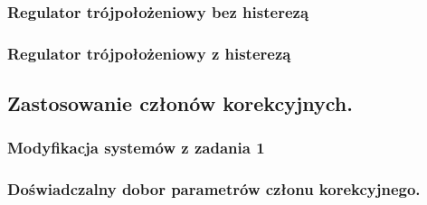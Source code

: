 \documentclass[a4paper,10pt]{article}
\begin{document}
\subsubsection{Regulator trójpołożeniowy bez histerezą}\label{sec:r3bh}

\subsubsection{Regulator trójpołożeniowy z histerezą}\label{sec:r3h}
\subsection{Zastosowanie członów korekcyjnych.}\label{sec:zad2}
\subsubsection{Modyfikacja systemów z zadania 1}\label{sec:zad2_1}
\subsubsection{Doświadczalny dobor parametrów członu korekcyjnego.}\label{sec:zad2_2}
\end{document}
